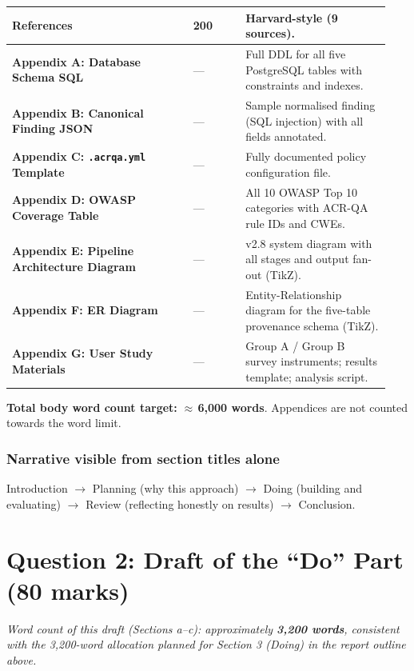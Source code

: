 \documentclass[12pt,a4paper]{article}
\begin{document}
\begin{longtable}{p{0.45\linewidth}p{0.13\linewidth}p{0.36\linewidth}}
\textbf{References} & 200 & Harvard-style (9 sources).\\
\midrule

\textbf{Appendix A: Database Schema SQL}    & ---
  & Full DDL for all five PostgreSQL tables with constraints and indexes.\\
\textbf{Appendix B: Canonical Finding JSON} & ---
  & Sample normalised finding (SQL injection) with all fields annotated.\\
\textbf{Appendix C: \texttt{.acrqa.yml} Template} & ---
  & Fully documented policy configuration file.\\
\textbf{Appendix D: OWASP Coverage Table}  & ---
  & All 10 OWASP Top 10 categories with ACR-QA rule IDs and CWEs.\\
\textbf{Appendix E: Pipeline Architecture Diagram} & ---
  & v2.8 system diagram with all stages and output fan-out (TikZ).\\
\textbf{Appendix F: ER Diagram}            & ---
  & Entity-Relationship diagram for the five-table provenance schema (TikZ).\\
\textbf{Appendix G: User Study Materials}  & ---
  & Group A / Group B survey instruments; results template; analysis script.\\
\bottomrule
\end{longtable}

\vspace{0.5em}
\noindent\textbf{Total body word count target:} $\approx$\,\textbf{6,000 words}.
Appendices are not counted towards the word limit.

\subsubsection*{Narrative visible from section titles alone}
Introduction $\to$ Planning (why this approach) $\to$ Doing (building and evaluating)
$\to$ Review (reflecting honestly on results) $\to$ Conclusion.

\section{Question 2: Draft of the ``Do'' Part (80 marks)}

\noindent\textit{Word count of this draft (Sections a--c): approximately
\textbf{3,200 words}, consistent with the 3,200-word allocation planned for
Section 3 (Doing) in the report outline above.}
\end{document}
